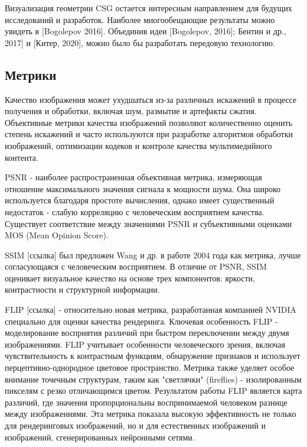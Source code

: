 \documentclass[a4paper,hidelinks,12pt]{article}
\begin{document}
Визуализация геометрии CSG остается интересным направлением для будущих исследований и разработок. 
Наиболее многообещающие результаты можно увидеть в [Bogolepov 2016]. Объединив идеи [Bogolepov, 2016]; Бентин и др., 2017] и [Китер, 2020], можно было бы разработать передовую технологию.

\newpage

\subsection{Метрики}

Качество изображения может ухудшаться из-за различных искажений в процессе получения и обработки, включая шум, 
размытие и артефакты сжатия. Объективные метрики качества изображений позволяют количественно оценить 
степень искажений и часто используются при разработке алгоритмов обработки изображений, оптимизации кодеков и 
контроле качества мультимедийного контента.

\par

PSNR - наиболее распространенная объективная метрика, измеряющая отношение максимального значения сигнала к мощности шума. Она широко используется 
благодаря простоте вычисления, однако имеет существенный недостаток - слабую корреляцию с человеческим восприятием качества. 
Существует соответствие между значениями PSNR и субъективными оценками MOS (Mean Opinion Score). 

SSIM [ссылка] был предложен Wang и др. в работе 2004 года как 
метрика, лучше согласующаяся с человеческим восприятием. В отличие от PSNR, SSIM оценивает визуальное качество на основе трех 
компонентов: яркости, контрастности и структурной информации. 

FLIP [ссылка] - относительно новая метрика, разработанная компанией NVIDIA специально для оценки качества рендеринга. Ключевая особенность FLIP - моделирование восприятия различий при быстром переключении между двумя изображениями.
FLIP учитывает особенности человеческого зрения, включая чувствительность к контрастным функциям, обнаружение признаков и использует перцептивно-однородное цветовое пространство. 
Метрика также уделяет особое внимание точечным структурам, таким как "светлячки" (fireflies) - изолированным пикселям с резко отличающимся цветом. 
Результатом работы FLIP является карта различий, где значения пропорциональны воспринимаемой человеком разнице между изображениями. 
Эта метрика показала высокую эффективность не только для рендеринговых изображений, но и для естественных изображений и изображений, сгенерированных нейронными сетями.
\end{document}
